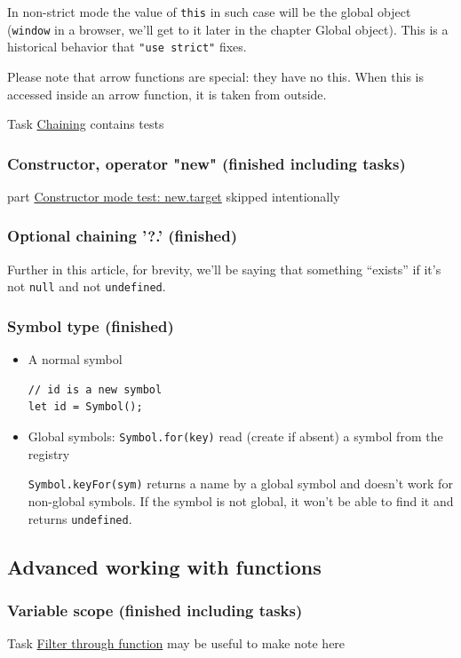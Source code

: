 \documentclass[a4paper, 12pt]{article}
\begin{document}
\noindent In non-strict mode the value of \verb|this| in such case will be the global object (\verb|window| in a browser, we'll get to it later in the chapter Global object). This is a historical behavior that \verb|"use strict"| fixes.

Please note that arrow functions are special: they have no this. When this is accessed inside an arrow function, it is taken from outside.

Task \href{https://javascript.info/object-methods#chaining}{Chaining} contains tests

\subsubsection{Constructor, operator "new" (finished including tasks)}
part \href{https://javascript.info/constructor-new#constructor-mode-test-new-target}{Constructor mode test: new.target} skipped intentionally

\subsubsection{Optional chaining '?.' (finished)}
Further in this article, for brevity, we'll be saying that something “exists” if it's not \verb|null| and not \verb|undefined|.

\subsubsection{Symbol type (finished)}
\begin{itemize}
\item 
A normal symbol
\begin{verbatim}
// id is a new symbol
let id = Symbol();
\end{verbatim}

\item 
Global symbols: \verb|Symbol.for(key)| read (create if absent) a symbol from the registry

\verb|Symbol.keyFor(sym)| returns a name by a global symbol and doesn't work for non-global symbols. If the symbol is not global, it won't be able to find it and returns \verb|undefined|.

\end{itemize}

\subsection{Advanced working with functions}
\subsubsection{Variable scope (finished including tasks)}
Task \href{https://javascript.info/closure#filter-through-function}{Filter through function} may be useful to make note here
\end{document}
